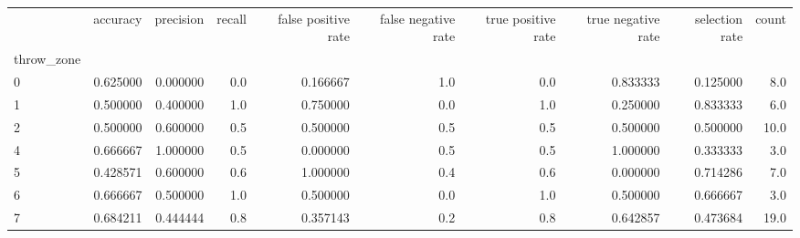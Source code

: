 \begin{tabular}{lrrrrrrrrr}
\toprule
{} &  accuracy &  precision &  recall &  false positive rate &  false negative rate &  true positive rate &  true negative rate &  selection rate &  count \\
throw\_zone &           &            &         &                      &                      &                     &                     &                 &        \\
\midrule
0          &  0.625000 &   0.000000 &     0.0 &             0.166667 &                  1.0 &                 0.0 &            0.833333 &        0.125000 &    8.0 \\
1          &  0.500000 &   0.400000 &     1.0 &             0.750000 &                  0.0 &                 1.0 &            0.250000 &        0.833333 &    6.0 \\
2          &  0.500000 &   0.600000 &     0.5 &             0.500000 &                  0.5 &                 0.5 &            0.500000 &        0.500000 &   10.0 \\
4          &  0.666667 &   1.000000 &     0.5 &             0.000000 &                  0.5 &                 0.5 &            1.000000 &        0.333333 &    3.0 \\
5          &  0.428571 &   0.600000 &     0.6 &             1.000000 &                  0.4 &                 0.6 &            0.000000 &        0.714286 &    7.0 \\
6          &  0.666667 &   0.500000 &     1.0 &             0.500000 &                  0.0 &                 1.0 &            0.500000 &        0.666667 &    3.0 \\
7          &  0.684211 &   0.444444 &     0.8 &             0.357143 &                  0.2 &                 0.8 &            0.642857 &        0.473684 &   19.0 \\
\bottomrule
\end{tabular}
